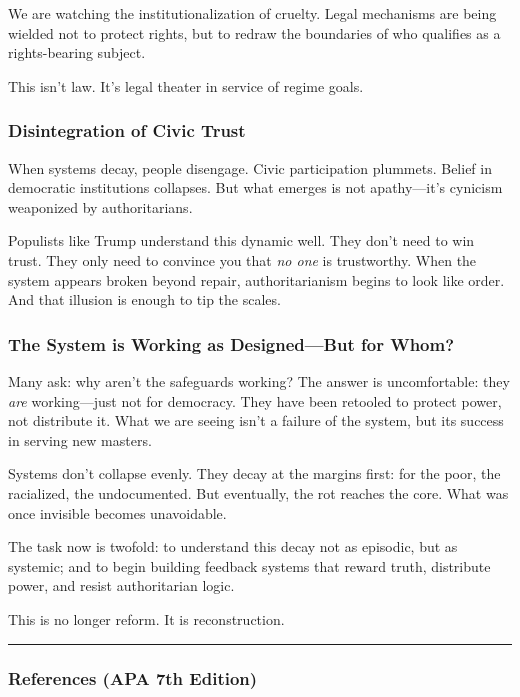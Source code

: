 \documentclass[
]{article}
\begin{document}
We are watching the institutionalization of cruelty. Legal mechanisms are being wielded not to protect rights, but to redraw the boundaries of who qualifies as a rights-bearing subject.

This isn't law. It's legal theater in service of regime goals.

\subsubsection{Disintegration of Civic Trust}\label{disintegration-of-civic-trust}

When systems decay, people disengage. Civic participation plummets. Belief in democratic institutions collapses. But what emerges is not apathy---it's cynicism weaponized by authoritarians.

Populists like Trump understand this dynamic well. They don't need to win trust. They only need to convince you that \emph{no one} is trustworthy. When the system appears broken beyond repair, authoritarianism begins to look like order. And that illusion is enough to tip the scales.

\subsubsection{The System is Working as Designed---But for Whom?}\label{the-system-is-working-as-designedbut-for-whom}

Many ask: why aren't the safeguards working? The answer is uncomfortable: they \emph{are} working---just not for democracy. They have been retooled to protect power, not distribute it. What we are seeing isn't a failure of the system, but its success in serving new masters.

Systems don't collapse evenly. They decay at the margins first: for the poor, the racialized, the undocumented. But eventually, the rot reaches the core. What was once invisible becomes unavoidable.

The task now is twofold: to understand this decay not as episodic, but as systemic; and to begin building feedback systems that reward truth, distribute power, and resist authoritarian logic.

This is no longer reform. It is reconstruction.

\begin{center}\rule{0.5\linewidth}{0.5pt}\end{center}

\subsubsection{References (APA 7th Edition)}\label{references-apa-7th-edition}
\end{document}
